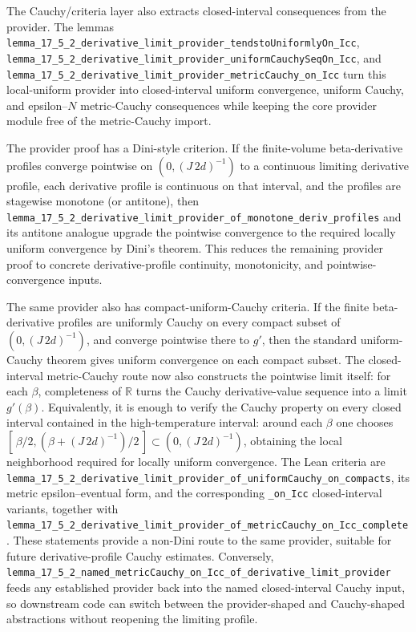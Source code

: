 \documentclass[a4paper,11pt]{article}
\begin{document}
The Cauchy/criteria layer also extracts closed-interval consequences from the
provider.  The lemmas
\texttt{lemma\_17\_5\_2\_derivative\_limit\_provider\_tendstoUniformlyOn\_Icc},
\texttt{lemma\_17\_5\_2\_derivative\_limit\_provider\_uniformCauchySeqOn\_Icc},
and
\texttt{lemma\_17\_5\_2\_derivative\_limit\_provider\_metricCauchy\_on\_Icc}
turn this local-uniform provider into closed-interval uniform convergence,
uniform Cauchy, and epsilon--\(N\) metric-Cauchy consequences while keeping
the core provider module free of the metric-Cauchy import.

The provider proof has a Dini-style criterion.  If the finite-volume
beta-derivative profiles converge pointwise on \((0,(J\,2d)^{-1})\) to a
continuous limiting derivative profile, each derivative profile is continuous
on that interval, and the profiles are stagewise monotone (or antitone), then
\texttt{lemma\_17\_5\_2\_derivative\_limit\_provider\_of\_monotone\_deriv\_profiles}
and its antitone analogue upgrade the pointwise convergence to the required
locally uniform convergence by Dini's theorem.  This reduces the remaining
provider proof to concrete derivative-profile continuity, monotonicity, and
pointwise-convergence inputs.

The same provider also has compact-uniform-Cauchy criteria.  If the finite
beta-derivative profiles are uniformly Cauchy on every compact subset of
\((0,(J\,2d)^{-1})\), and converge pointwise there to \(g'\), then the
standard uniform-Cauchy theorem gives uniform convergence on each compact
subset.  The closed-interval metric-Cauchy route now also constructs the
pointwise limit itself: for each \(\beta\), completeness of \(\mathbb{R}\)
turns the Cauchy derivative-value sequence into a limit \(g'(\beta)\).
Equivalently, it is enough to verify the Cauchy property on every closed
interval contained in the high-temperature interval: around each \(\beta\) one
chooses
\([\,\beta/2,(\beta+(J\,2d)^{-1})/2\,]\subset (0,(J\,2d)^{-1})\), obtaining
the local neighborhood required for locally uniform convergence.  The Lean
criteria are
\texttt{lemma\_17\_5\_2\_derivative\_limit\_provider\_of\_uniformCauchy\_on\_compacts},
its metric epsilon--eventual form, and the corresponding
\texttt{\_on\_Icc} closed-interval variants, together with
\texttt{lemma\_17\_5\_2\_derivative\_limit\_provider\_of\_metricCauchy\_on\_Icc\_complete}.
These statements provide a non-Dini route to the same provider, suitable for
future derivative-profile Cauchy estimates.  Conversely,
\texttt{lemma\_17\_5\_2\_named\_metricCauchy\_on\_Icc\_of\_derivative\_limit\_provider}
feeds any established provider back into the named closed-interval Cauchy
input, so downstream code can switch between the provider-shaped and
Cauchy-shaped abstractions without reopening the limiting profile.
\end{document}
